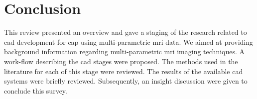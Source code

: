 \section{Conclusion} \label{sec:conclusion}

This review presented an overview and gave a staging of the research related to \ac{cad} development for \ac{cap} using multi-parametric \ac{mri} data. We aimed at providing background information regarding multi-parametric \ac{mri} imaging techniques. A work-flow describing the \ac{cad} stages were proposed. The methods used in the literature for each of this stage were reviewed. The results of the available \ac{cad} systems were briefly reviewed. Subsequently, an insight discussion were given to conclude this survey. 